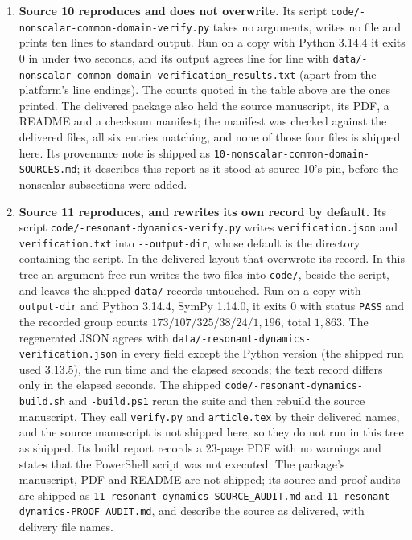 \documentclass[11pt,letterpaper]{article}
\theoremstyle{definition}
\theoremstyle{remark}
\numberwithin{equation}{section}
\begin{document}
\begin{enumerate}[label=(\arabic*)]
package root, and its \texttt{Makefile} calls the script by its delivered
name \texttt{verify.py}. The placed
\texttt{code/-exact-and-drifting-multipliers-build.sh} and the
\texttt{pdf} target of
\texttt{code/-single-loss-linearization-Makefile} build the
two standalone source manuscripts, which are not shipped in this directory.
Neither package ships or promises a checksum manifest.
\item \textbf{Source 10 reproduces and does not overwrite.} Its script
\texttt{code/-nonscalar-\allowbreak common-domain-\allowbreak verify.py} takes no
arguments, writes no file and prints ten lines to standard output. Run on a
copy with Python 3.14.4 it exits $0$ in under two seconds, and its output
agrees line for line with
\texttt{data/-nonscalar-\allowbreak common-domain-\allowbreak verification\_\allowbreak results.txt}
(apart from the platform's line endings). The counts quoted in the table
above are the ones printed. The delivered package also held the source
manuscript, its PDF, a README and a checksum manifest; the manifest was
checked against the delivered files, all six entries matching, and none of
those four files is shipped here. Its provenance note is shipped as
\texttt{10-nonscalar-\allowbreak common-domain-\allowbreak SOURCES.md}; it describes this report as
it stood at source 10's pin, before the nonscalar subsections were added.
\item \textbf{Source 11 reproduces, and rewrites its own record by default.}
Its script \texttt{code/-resonant-dynamics-verify.py} writes
\texttt{verification.json} and \texttt{verification.txt} into
\texttt{-{}-output-dir}, whose default is the directory containing the
script. In the delivered layout that overwrote its record. In this tree an
argument-free run writes the two files into \texttt{code/}, beside the
script, and leaves the shipped \texttt{data/} records untouched. Run on a
copy with \texttt{-{}-output-dir} and Python 3.14.4, SymPy 1.14.0, it exits
$0$ with status \texttt{PASS} and the recorded group counts
$173/107/325/38/24/1{,}196$, total $1{,}863$. The regenerated JSON agrees
with \texttt{data/-resonant-dynamics-verification.json} in
every field except the Python version (the shipped run used 3.13.5), the
run time and the elapsed seconds; the text record differs only in the
elapsed seconds. The shipped \texttt{code/-resonant-dynamics-build.sh} and \texttt{-build.ps1} rerun the suite and
then rebuild the source manuscript. They call \texttt{verify.py} and
\texttt{article.tex} by their delivered names, and the source manuscript is
not shipped here, so they do not run in this tree as shipped. Its build
report records a 23-page PDF with no warnings and states that the
PowerShell script was not executed. The package's manuscript, PDF and
README are not shipped; its source and proof audits are shipped as
\texttt{11-resonant-dynamics-SOURCE\_AUDIT.md} and
\texttt{11-resonant-dynamics-PROOF\_AUDIT.md}, and describe the source as
delivered, with delivery file names.
\end{enumerate}
\end{document}
